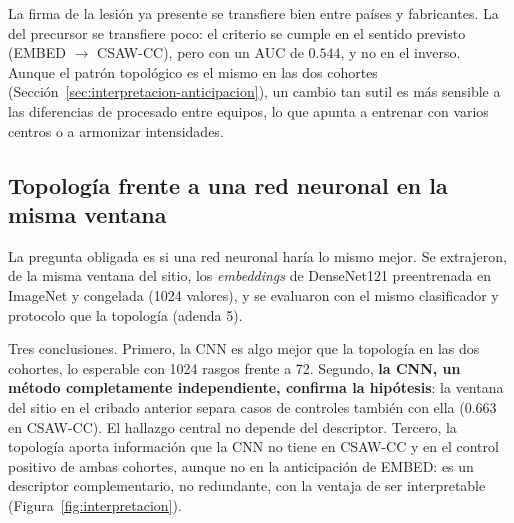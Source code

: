 La firma de la lesión ya presente se transfiere bien entre países y
fabricantes. La del precursor se transfiere poco: el criterio se cumple en
el sentido previsto (EMBED $\rightarrow$ CSAW-CC), pero con un AUC de
$0.544$, y no en el inverso. Aunque el patrón topológico es el mismo en las
dos cohortes (Sección~\ref{sec:interpretacion-anticipacion}), un cambio tan
sutil es más sensible a las diferencias de procesado entre equipos, lo que
apunta a entrenar con varios centros o a armonizar intensidades.

\subsection{Topología frente a una red neuronal en la misma ventana}
La pregunta obligada es si una red neuronal haría lo mismo mejor. Se
extrajeron, de la misma ventana del sitio, los \textit{embeddings} de
DenseNet121 preentrenada en ImageNet y congelada (1024 valores), y se
evaluaron con el mismo clasificador y protocolo que la topología (adenda 5).

\begin{table}[H]
\centering
\caption{Topología frente a una CNN congelada en la misma ventana del sitio
(AUC). La última fila es el OR por desviación típica de la puntuación
topológica en una regresión logística condicional que incluye también la
puntuación de la CNN.}
\label{tab:cnn}
\end{table}

Tres conclusiones. Primero, la CNN es algo mejor que la topología en las dos
cohortes, lo esperable con 1024 rasgos frente a 72. Segundo, \textbf{la CNN,
un método completamente independiente, confirma la hipótesis}: la ventana
del sitio en el cribado anterior separa casos de controles también con ella
($0.663$ en CSAW-CC). El hallazgo central no depende del descriptor. Tercero,
la topología aporta información que la CNN no tiene en CSAW-CC y en el
control positivo de ambas cohortes, aunque no en la anticipación de EMBED:
es un descriptor complementario, no redundante, con la ventaja de ser
interpretable (Figura~\ref{fig:interpretacion}).

